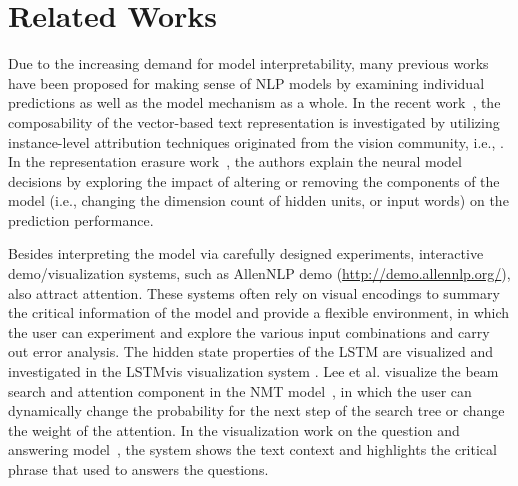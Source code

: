 \section{Related Works}
Due to the increasing demand for model interpretability, many previous works have been proposed for making sense of NLP models by examining individual predictions as well as the model mechanism as a whole. 
%
In the recent work~\cite{LiChenHovy2015}, the composability of the vector-based text representation is investigated by utilizing instance-level attribution techniques originated from the vision community, i.e., \cite{ZeilerFergus2014}. 
%
In the representation erasure work~\cite{li2016understanding}, the authors explain the neural model decisions by exploring the impact of altering or removing the components of the model (i.e., changing the dimension count of hidden units, or input words) on the prediction performance. 

Besides interpreting the model via carefully designed experiments, interactive demo/visualization systems, such as AllenNLP demo (\url{http://demo.allennlp.org/}), also attract attention. These systems often rely on visual encodings to summary the critical information of the model and provide a flexible environment, in which the user can experiment and explore the various input combinations and carry out error analysis.
The hidden state properties of the LSTM are visualized and investigated in the LSTMvis visualization system \cite{StrobeltGehrmannPfister2018}.
Lee et al. visualize the beam search and attention component in the NMT model~\cite{lee2017interactive},  in which the user can dynamically change the probability for the next step of the search tree or change the weight of the attention.
In the visualization work on the question and answering model~\cite{ruckle2017end}, the system shows the text context and highlights the critical phrase that used to answers the questions. 

